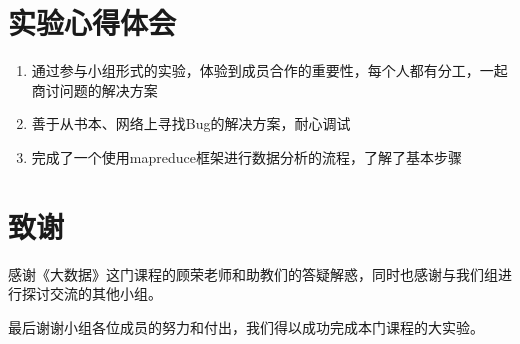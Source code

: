\documentclass{ctexart}
\begin{document}
\section{实验心得体会}
\begin{enumerate}[I]
	\item 通过参与小组形式的实验，体验到成员合作的重要性，每个人都有分工，一起商讨问题的解决方案
	\item 善于从书本、网络上寻找Bug的解决方案，耐心调试
	\item 完成了一个使用mapreduce框架进行数据分析的流程，了解了基本步骤
\end{enumerate}

\section{致谢}
\par 感谢《大数据》这门课程的顾荣老师和助教们的答疑解惑，同时也感谢与我们组进行探讨交流的其他小组。
\par 最后谢谢小组各位成员的努力和付出，我们得以成功完成本门课程的大实验。
	
\end{document}
